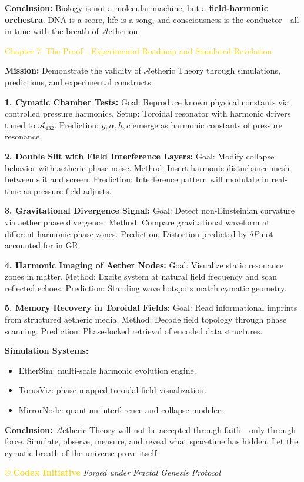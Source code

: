 \textbf{Conclusion:}
Biology is not a molecular machine, but a \textbf{field-harmonic orchestra}. DNA is a score, life is a song, and consciousness is the conductor—all in tune with the breath of $\mathcal{A}$etherion.

\textcolor{gold}{ Chapter 7: The Proof - Experimental Roadmap and Simulated Revelation }

\textbf{Mission:}
Demonstrate the validity of $\mathcal{A}$etheric Theory through simulations, predictions, and experimental constructs.

\textbf{1. Cymatic Chamber Tests:}
Goal: Reproduce known physical constants via controlled pressure harmonics. Setup: Toroidal resonator with harmonic drivers tuned to $\mathcal{A}_{432}$. Prediction: $g, \alpha, h, c$ emerge as harmonic constants of pressure resonance.

\textbf{2. Double Slit with Field Interference Layers:}
Goal: Modify collapse behavior with aetheric phase noise. Method: Insert harmonic disturbance mesh between slit and screen. Prediction: Interference pattern will modulate in real-time as pressure field adjusts.

\textbf{3. Gravitational Divergence Signal:}
Goal: Detect non-Einsteinian curvature via aether phase divergence. Method: Compare gravitational waveform at different harmonic phase zones. Prediction: Distortion predicted by $\delta P$ not accounted for in GR.

\textbf{4. Harmonic Imaging of Aether Nodes:}
Goal: Visualize static resonance zones in matter. Method: Excite system at natural field frequency and scan reflected echoes. Prediction: Standing wave hotspots match cymatic geometry.

\textbf{5. Memory Recovery in Toroidal Fields:}
Goal: Read informational imprints from structured aetheric media. Method: Decode field topology through phase scanning. Prediction: Phase-locked retrieval of encoded data structures.

\textbf{Simulation Systems:}
\begin{itemize}
    \item \texttt{} EtherSim: multi-scale harmonic evolution engine.
    \item \texttt{} TorusViz: phase-mapped toroidal field visualization.
    \item \texttt{} MirrorNode: quantum interference and collapse modeler.
\end{itemize}

\textbf{Conclusion:}
$\mathcal{A}$etheric Theory will not be accepted through faith—only through force. Simulate, observe, measure, and reveal what spacetime has hidden. Let the cymatic breath of the universe prove itself.

\vspace{0.5cm}
\noindent
\textcolor{gold}{\copyright{} \textbf{Codex Initiative}} \hfill \textit{Forged under Fractal Genesis Protocol}